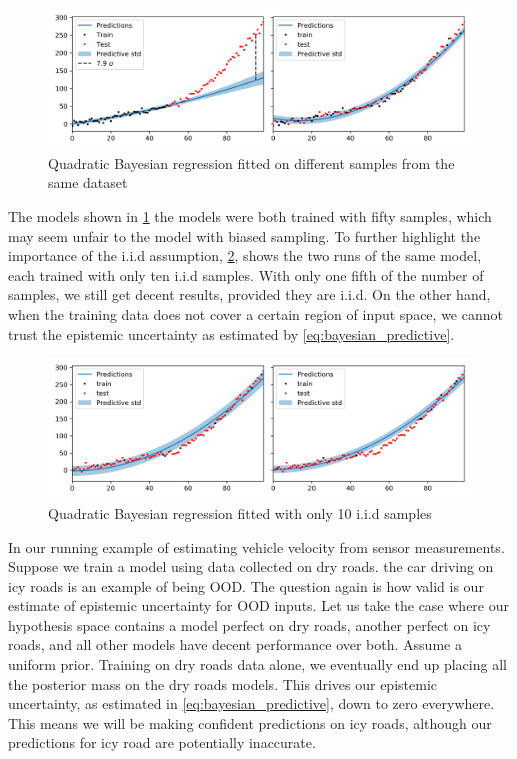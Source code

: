 \begin{figure}
    \centering
    \includegraphics[width=1\textwidth]{Background/BayesianRidge2.png}
    \caption{Quadratic Bayesian regression fitted on different samples from the same dataset}
    \label{fig:bayesian_ridge}
\end{figure}

The models shown in \cref{fig:bayesian_ridge} the models were both trained with fifty samples, which may seem unfair to the model with biased sampling. 
To further highlight the importance of the i.i.d assumption, \cref{fig:bayesian_ridge_low}, shows the two runs of the same model, each trained with only ten i.i.d samples. With only one fifth of the number of samples, we still get decent results, provided they are i.i.d. On the other hand, when the training data does not cover a certain region of input space, we cannot trust the epistemic uncertainty as estimated by \cref{eq:bayesian_predictive}.

\begin{figure}
    \centering
    \includegraphics[width=1\textwidth]{Background/BayesianRidgeLow.png}
    \caption{Quadratic Bayesian regression fitted with only 10 i.i.d samples}
    \label{fig:bayesian_ridge_low}
\end{figure}


In our running example of estimating vehicle velocity from sensor measurements. 
Suppose we train a model using data collected on dry roads. the car driving on icy roads is an example of being OOD.
The question again is how valid is our estimate of epistemic uncertainty for OOD inputs. Let us take the case where our hypothesis space contains a model perfect on dry roads, another perfect on icy roads, and all other models have decent performance over both. Assume a uniform prior. Training on dry roads data alone, we eventually end up placing all the posterior mass on the dry roads models.
This drives our epistemic uncertainty, as estimated in \cref{eq:bayesian_predictive}, down to zero everywhere. This means we will be making confident predictions on icy roads, although our predictions for icy road are potentially inaccurate. 

